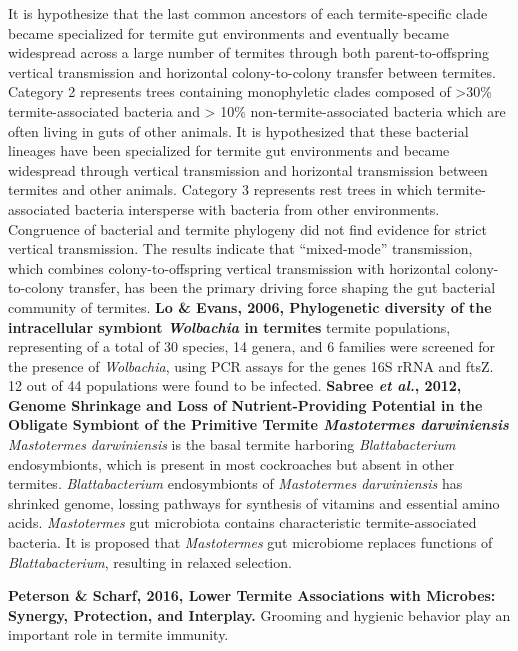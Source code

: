 \documentclass[11pt]{article}
\begin{document}
\begin{sloppypar}
It is hypothesize that the last common ancestors of each termite-specific clade became specialized for termite gut environments and eventually became widespread across a large number of termites through both parent-to-offspring vertical transmission and horizontal colony-to-colony transfer between termites. 
Category 2 represents trees containing monophyletic clades composed of >30\% termite-associated bacteria and > 10\% non-termite-associated bacteria which are often living in guts of other animals. 
It is hypothesized that these bacterial lineages have been specialized for termite gut environments and became widespread through vertical transmission and horizontal transmission between termites and other animals. 
Category 3 represents rest trees in which termite-associated bacteria intersperse with bacteria from other environments. 
Congruence of bacterial and termite phylogeny did not find evidence for strict vertical transmission. 
The results indicate that “mixed-mode” transmission, which combines colony-to-offspring vertical transmission with horizontal colony-to-colony transfer, has been the primary driving force shaping the gut bacterial community of termites.
\textbf{Lo & Evans, 2006, Phylogenetic diversity of the intracellular symbiont \textit{Wolbachia} in termites}   termite populations, representing of a total of 30 species, 14 genera, and 6 families were screened for the presence of \textit{Wolbachia}, using PCR assays for the genes 16S rRNA and ftsZ. 
12 out of 44 populations were found to be infected. 
\textbf{Sabree \textit{et al.}, 2012, Genome Shrinkage and Loss of Nutrient-Providing Potential in the Obligate Symbiont of the Primitive Termite \textit{Mastotermes darwiniensis}} \newline
\textit{Mastotermes darwiniensis} is the basal termite harboring \textit{Blattabacterium} endosymbionts, which is present in most cockroaches but absent in other termites. 
\textit{Blattabacterium} endosymbionts of \textit{Mastotermes darwiniensis} has shrinked genome, lossing pathways for synthesis of vitamins and essential amino acids. 
\textit{Mastotermes} gut microbiota contains characteristic termite-associated bacteria.
It is proposed that \textit{Mastotermes} gut microbiome replaces functions of \textit{Blattabacterium}, resulting in relaxed selection.
\par
\textbf{Peterson & Scharf, 2016, Lower Termite Associations with Microbes: Synergy, Protection, and Interplay.} \newline
Grooming and hygienic behavior play an important role in termite immunity. 

\end{sloppypar}
\end{document}
